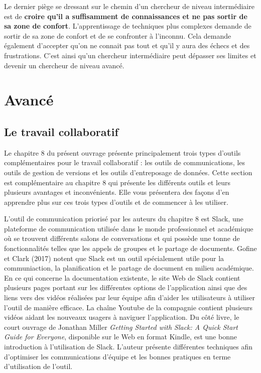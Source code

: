 \documentclass[
  letterpaper,
  DIV=11,
  numbers=noendperiod]{scrreprt}
\begin{document}
Le dernier piège se dressant sur le chemin d'un chercheur de niveau
intermédiaire est de \textbf{croire qu'il a suffisamment de
connaissances et ne pas sortir de sa zone de confort}. L'apprentissage
de techniques plus complexes demande de sortir de sa zone de confort et
de se confronter à l'inconnu. Cela demande également d'accepter qu'on ne
connait pas tout et qu'il y aura des échecs et des frustrations. C'est
ainsi qu'un chercheur intermédiaire peut dépasser ses limites et devenir
un chercheur de niveau avancé.

\hypertarget{avancuxe9}{%
\section{Avancé}\label{avancuxe9}}

\hypertarget{le-travail-collaboratif}{%
\subsection{Le travail collaboratif}\label{le-travail-collaboratif}}

Le chapitre 8 du présent ouvrage présente principalement trois types
d'outils complémentaires pour le travail collaboratif : les outils de
communications, les outils de gestion de versions et les outils
d'entreposage de données. Cette section est complémentaire au chapitre 8
qui présente les différents outils et leurs plusieurs avantages et
inconvénients. Elle vous présentera des façons d'en apprendre plus sur
ces trois types d'outils et de commencer à les utiliser.

L'outil de communication priorisé par les auteurs du chapitre 8 est
Slack, une plateforme de communication utilisée dans le monde
professionnel et académique où se trouvent différents salons de
conversations et qui possède une tonne de fonctionnalités telles que les
appels de groupes et le partage de documents. Gofine et Clark (2017)
notent que Slack est un outil spécialement utile pour la communiaction,
la planification et le partage de document en milieu académique. En ce
qui concerne la documentation existente, le site Web de Slack contient
plusieurs pages portant sur les différentes options de l'application
ainsi que des liens vers des vidéos réalisées par leur équipe afin
d'aider les utilisateurs à utiliser l'outil de manière efficace. La
chaîne Youtube de la compagnie contient plusieurs vidéos aidant les
nouveaux usagers à naviguer l'application. Du côté livre, le court
ouvrage de Jonathan Miller \emph{Getting Started with Slack: A Quick
Start Guide for Everyone}, disponible sur le Web en format Kindle, est
une bonne introduction à l'utilisation de Slack. L'auteur présente
différentes techniques afin d'optimiser les communications d'équipe et
les bonnes pratiques en terme d'utilisation de l'outil.
\end{document}
